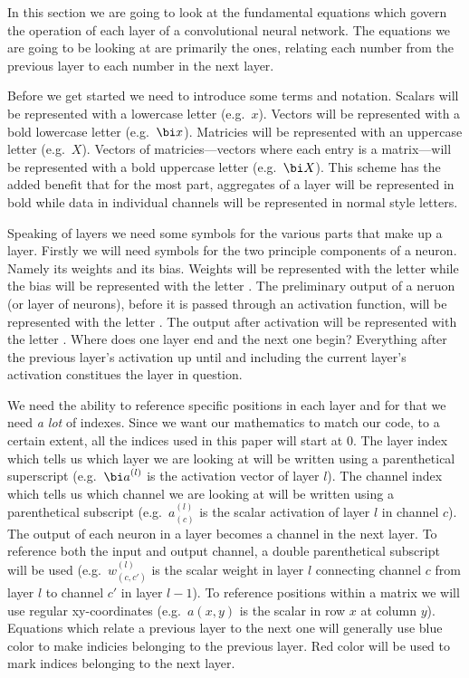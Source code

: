 \startsection[title=Layers of convolutional neural networks]

In this section we are going to look at the fundamental equations which govern the operation of each layer of a convolutional neural network.
The equations we are going to be looking at are primarily the  ones, relating each number from the previous layer to each number in the next layer.

\startsubsubject[title=Terminology and notation]
Before we get started we need to introduce some terms and notation.
Scalars will be represented with a lowercase letter (e.g.\ $x$).
Vectors will be represented with a bold lowercase letter (e.g.\ $\bi x$).
Matricies will be represented with an uppercase letter (e.g.\ $X$).
Vectors of matricies---vectors where each entry is a matrix---will be represented with a bold uppercase letter (e.g.\ $\bi X$).
This scheme has the added benefit that for the most part, aggregates of a layer will be represented in bold while data in individual channels will be represented in normal style letters.

Speaking of layers we need some symbols for the various parts that make up a layer.
Firstly we will need symbols for the two principle components of a neuron.
Namely its weights and its bias.
Weights will be represented with the letter  while the bias will be represented with the letter .
The preliminary output of a neruon (or layer of neurons), before it is passed through an activation function, will be represented with the letter .
The output after activation will be represented with the letter .
Where does one layer end and the next one begin?
Everything after the previous layer's activation up until and including the current layer's activation constitues the layer in question.

We need the ability to reference specific positions in each layer and for that we need {\em a lot} of indexes.
Since we want our mathematics to match our code, to a certain extent, all the indices used in this paper will start at $0$.
The layer index which tells us which layer we are looking at will be written using a parenthetical superscript (e.g.\ ${\bi a}^{(l)}$ is the activation vector of layer $l$).
The channel index which tells us which channel we are looking at will be written using a parenthetical subscript (e.g.\ $a^{(l)}_{(c)}$ is the scalar activation of layer $l$ in channel $c$).
The output of each neuron in a layer becomes a channel in the next layer.
To reference both the input and output channel, a double parenthetical subscript will be used (e.g.\ $w^{(l)}_{(c,c')}$ is the scalar weight in layer $l$ connecting channel $c$ from layer $l$ to channel $c'$ in layer $l-1$).
To reference positions within a matrix we will use regular xy-coordinates (e.g.\ $a(x,y)$ is the scalar in row $x$ at column $y$).
Equations which relate a previous layer to the next one will generally use blue color to make indicies belonging to the previous layer.
Red color will be used to mark indices belonging to the next layer.


